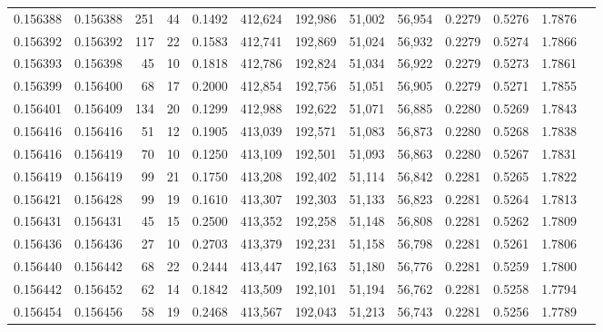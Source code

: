 \begin{tabular}{rrrrrrrrrrrrr}
0.156388 & 0.156388 &   251 &  44 &                                     0.1492 & 412,624 & 192,986 &  51,002 &  56,954 & 0.2279 & 0.5276 & 1.7876 \\
0.156392 & 0.156392 &   117 &  22 &                                     0.1583 & 412,741 & 192,869 &  51,024 &  56,932 & 0.2279 & 0.5274 & 1.7866 \\
0.156393 & 0.156398 &    45 &  10 &                                     0.1818 & 412,786 & 192,824 &  51,034 &  56,922 & 0.2279 & 0.5273 & 1.7861 \\
0.156399 & 0.156400 &    68 &  17 &                                     0.2000 & 412,854 & 192,756 &  51,051 &  56,905 & 0.2279 & 0.5271 & 1.7855 \\
0.156401 & 0.156409 &   134 &  20 &                                     0.1299 & 412,988 & 192,622 &  51,071 &  56,885 & 0.2280 & 0.5269 & 1.7843 \\
0.156416 & 0.156416 &    51 &  12 &                                     0.1905 & 413,039 & 192,571 &  51,083 &  56,873 & 0.2280 & 0.5268 & 1.7838 \\
0.156416 & 0.156419 &    70 &  10 &                                     0.1250 & 413,109 & 192,501 &  51,093 &  56,863 & 0.2280 & 0.5267 & 1.7831 \\
0.156419 & 0.156419 &    99 &  21 &                                     0.1750 & 413,208 & 192,402 &  51,114 &  56,842 & 0.2281 & 0.5265 & 1.7822 \\
0.156421 & 0.156428 &    99 &  19 &                                     0.1610 & 413,307 & 192,303 &  51,133 &  56,823 & 0.2281 & 0.5264 & 1.7813 \\
0.156431 & 0.156431 &    45 &  15 &                                     0.2500 & 413,352 & 192,258 &  51,148 &  56,808 & 0.2281 & 0.5262 & 1.7809 \\
0.156436 & 0.156436 &    27 &  10 &                                     0.2703 & 413,379 & 192,231 &  51,158 &  56,798 & 0.2281 & 0.5261 & 1.7806 \\
0.156440 & 0.156442 &    68 &  22 &                                     0.2444 & 413,447 & 192,163 &  51,180 &  56,776 & 0.2281 & 0.5259 & 1.7800 \\
0.156442 & 0.156452 &    62 &  14 &                                     0.1842 & 413,509 & 192,101 &  51,194 &  56,762 & 0.2281 & 0.5258 & 1.7794 \\
0.156454 & 0.156456 &    58 &  19 &                                     0.2468 & 413,567 & 192,043 &  51,213 &  56,743 & 0.2281 & 0.5256 & 1.7789 \\

\end{tabular}
